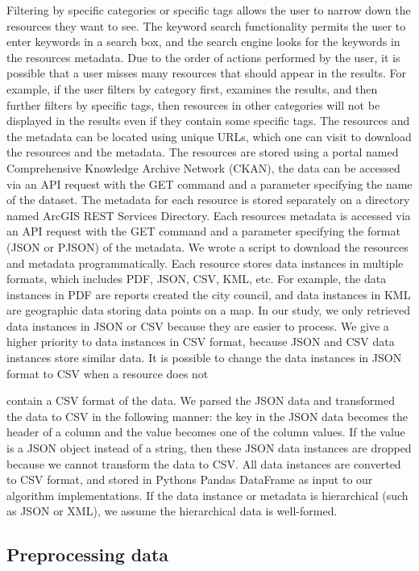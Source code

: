 Filtering by specific categories or specific tags allows the user to narrow down the resources they want to see. The keyword search functionality permits the user to enter keywords in a search box, and the search engine looks for the keywords in the resources metadata. Due to the order of actions performed by the user, it is possible that a user misses many resources that should appear in the results. For example, if the user filters by category first, examines the results, and then further filters by specific tags, then resources in other categories will not be displayed in the results even if they contain some specific tags.
The resources and the metadata can be located using unique URLs, which one can visit to download the resources and the metadata. The resources are stored using a portal named Comprehensive Knowledge Archive Network (CKAN), the data can be accessed via an API request with the GET command and a parameter specifying the name of the dataset. The metadata for each resource is stored separately on a directory named ArcGIS REST Services Directory. Each resources metadata is accessed via an API request with the GET command and a parameter specifying the format (JSON or PJSON) of the metadata. We wrote a script to download the resources and metadata programmatically.
Each resource stores data instances in multiple formats, which includes PDF, JSON, CSV, KML, etc. For example, the data instances in PDF are reports created the city council, and data instances in KML are geographic data storing data points on a map. In our study, we only retrieved data instances in JSON or CSV because they are easier to process. We give a higher priority to data instances in CSV format, because JSON and CSV data instances store similar data. It is possible to change the data instances in JSON format to CSV when a resource does not

contain a CSV format of the data. We parsed the JSON data and transformed the data to CSV in the following manner: the key in the JSON data becomes the header of a column and the value becomes one of the column values. If the value is a JSON object instead of a string, then these JSON data instances are dropped because we cannot transform the data to CSV. All data instances are converted to CSV format, and stored in Pythons Pandas DataFrame as input to our algorithm implementations.
If the data instance or metadata is hierarchical (such as JSON or XML), we assume the hierarchical data is well-formed.

\subsection{Preprocessing data}

